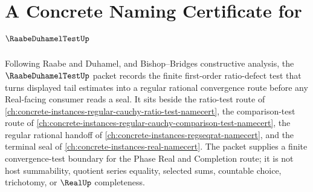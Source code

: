 \chapter{A Concrete Naming Certificate for $\RaabeDuhamelTestUp$}
\label{ch:concrete-instances-raabe-duhamel-test-namecert}

Following Raabe and Duhamel, and Bishop--Bridges constructive analysis, the $\RaabeDuhamelTestUp$ packet records the finite first-order ratio-defect test that turns displayed tail estimates into a regular rational convergence route before any Real-facing consumer reads a seal. It sits beside the ratio-test route of \autoref{ch:concrete-instances-regular-cauchy-ratio-test-namecert}, the comparison-test route of \autoref{ch:concrete-instances-regular-cauchy-comparison-test-namecert}, the regular rational handoff of \autoref{ch:concrete-instances-regseqrat-namecert}, and the terminal seal of \autoref{ch:concrete-instances-real-namecert}. The packet supplies a finite convergence-test boundary for the Phase Real and Completion route; it is not host summability, quotient series equality, selected sums, countable choice, trichotomy, or $\RealUp$ completeness.

